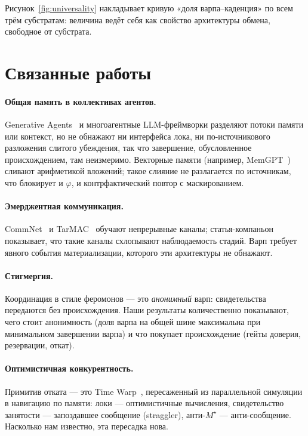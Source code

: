 \documentclass{article}
\newcommand{\mstar}{M^{\star}}
\begin{document}
Рисунок~\ref{fig:universality} накладывает кривую «доля
варпа--каденция» по всем трём субстратам: величина ведёт себя как
свойство архитектуры обмена, свободное от субстрата.

\section{Связанные работы}
\label{sec:related}

\paragraph{Общая память в коллективах агентов.} Generative
Agents~\cite{park2023generative} и многоагентные LLM-фреймворки
разделяют потоки памяти или контекст, но не обнажают ни интерфейса
лока, ни по-источникового разложения слитого убеждения, так что
завершение, обусловленное происхождением, там неизмеримо. Векторные
памяти (например, MemGPT~\cite{packer2023memgpt}) сливают
арифметикой вложений; такое слияние не разлагается по источникам, что
блокирует и $\varphi$, и контрфактический повтор с маскированием.
\paragraph{Эмерджентная коммуникация.} CommNet~\cite{sukhbaatar2016commnet}
и TarMAC~\cite{das2019tarmac} обучают непрерывные каналы;
статья-компаньон показывает, что такие каналы схлопывают
наблюдаемость стадий. Варп требует явного события материализации,
которого эти архитектуры не обнажают.
\paragraph{Стигмергия.} Координация в стиле феромонов --- это
\emph{анонимный} варп: свидетельства передаются без происхождения.
Наши результаты количественно показывают, чего стоит анонимность
(доля варпа на общей шине максимальна при минимальном завершении
варпа) и что покупает происхождение (гейты доверия, резервации,
откат).
\paragraph{Оптимистичная конкурентность.} Примитив отката --- это
Time Warp~\cite{jefferson1985}, пересаженный из параллельной
симуляции в навигацию по памяти: локи --- оптимистичные вычисления,
свидетельство занятости --- запоздавшее сообщение (straggler),
анти-$\mstar$ --- анти-сообщение. Насколько нам известно, эта
пересадка нова.
\end{document}
